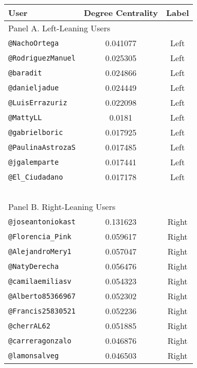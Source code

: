 %
    
    \begin{tabular}{lcc}
        \toprule\toprule
        User & Degree Centrality & Label \\  \midrule
        \multicolumn{3}{l}{Panel A. Left-Leaning Users} \\  \midrule
        \texttt{@NachoOrtega} & 0.041077 & Left \\ 
        \texttt{@RodriguezManuel} & 0.025305 & Left \\
        \texttt{@baradit} & 0.024866 & Left \\ 
        \texttt{@danieljadue} & 0.024449 & Left \\  
        \texttt{@LuisErrazuriz} & 0.022098 & Left \\  
        \texttt{@MattyLL} & 0.0181 & Left \\  
        \texttt{@gabrielboric} & 0.017925 & Left \\  
        \texttt{@PaulinaAstrozaS} & 0.017485 & Left \\  
        \texttt{@jgalemparte} & 0.017441 & Left \\  
        \texttt{@El\_Ciudadano} & 0.017178 & Left \\  
        ~ & ~ & ~ \\  \midrule
        \multicolumn{3}{l}{Panel B. Right-Leaning Users} \\  \midrule
        \texttt{@joseantoniokast} & 0.131623 & Right \\  
        \texttt{@Florencia\_Pink} & 0.059617 & Right \\  
        \texttt{@AlejandroMery1} & 0.057047 & Right \\  
        \texttt{@NatyDerecha} & 0.056476 & Right \\  
        \texttt{@camilaemiliasv} & 0.054323 & Right \\  
        \texttt{@Alberto85366967} & 0.052302 & Right \\  
        \texttt{@Francis25830521} & 0.052236 & Right \\  
        \texttt{@cherrAL62} & 0.051885 & Right \\  
        \texttt{@carreragonzalo} & 0.046876 & Right \\  
        \texttt{@lamonsalveg} & 0.046503 & Right \\  
        \bottomrule\bottomrule
    \end{tabular}
%